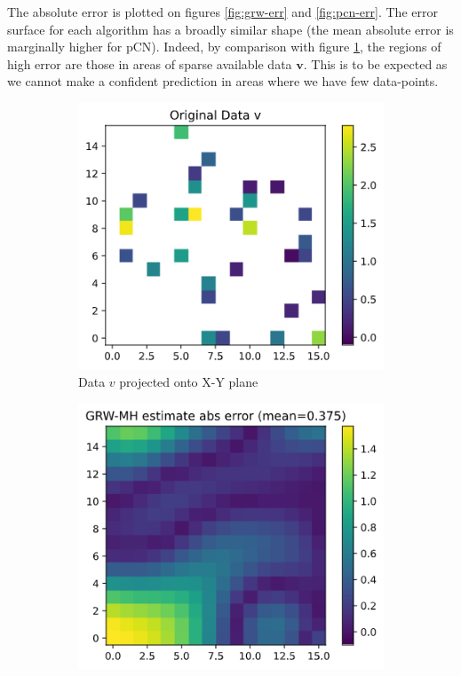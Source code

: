 \documentclass[]{article}
\newcommand{\vbold}{\boldsymbol{v}}
\begin{document}
The absolute error is plotted on figures \ref{fig:grw-err} and \ref{fig:pcn-err}. The error surface for each algorithm has a broadly similar shape (the mean absolute error is marginally higher for pCN). Indeed, by comparison with figure \ref{fig:v-2d}, the regions of high error are those in areas of sparse available data $\vbold$. This is to be expected as we cannot make a confident prediction in areas where we have few data-points.
%
\begin{figure}[!h]
	\centering
	\begin{subfigure}{0.32\linewidth}
		\includegraphics[width=\linewidth]{v-2d.png}
		\caption{Data $v$ projected onto X-Y plane}
		\label{fig:v-2d}
	\end{subfigure}
	\begin{subfigure}{0.32\linewidth}
		\includegraphics[width=\linewidth]{grw-mh-err.png}

\end{subfigure}
\end{figure}
\end{document}
